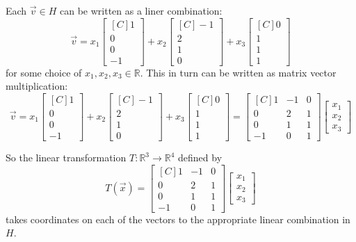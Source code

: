 \begin{example}
Each $\vec{v} \in H$ can be written as a liner combination:
\[
\vec{v}=
x_1\begin{bmatrix*}[C]1 \\ 0 \\ 0 \\ -1\end{bmatrix*}+
x_2\begin{bmatrix*}[C]-1 \\ 2 \\ 1 \\ 0\end{bmatrix*}+
x_3\begin{bmatrix*}[C]0 \\ 1 \\ 1 \\ 1\end{bmatrix*}
\]
for some choice of $x_1, x_2, x_3 \in \mathbb{R}$. This in turn can be written
as matrix vector multiplication:
\[
\vec{v}=
x_1\begin{bmatrix*}[C]1 \\ 0 \\ 0 \\ -1\end{bmatrix*}+
x_2\begin{bmatrix*}[C]-1 \\ 2 \\ 1 \\ 0\end{bmatrix*}+
x_3\begin{bmatrix*}[C]0 \\ 1 \\ 1 \\ 1\end{bmatrix*}
=
\begin{bmatrix*}[C]
1 & -1 & 0 \\
0 & 2 & 1 \\
0 & 1 & 1 \\
-1 & 0 & 1 
\end{bmatrix*}
\begin{bmatrix}
x_1 \\ x_2 \\ x_3
\end{bmatrix}
\]

So the linear transformation $T:\mathbb{R}^3 \to \mathbb{R}^4$ defined by 
\[
T(\vec{x})=\begin{bmatrix*}[C]
1 & -1 & 0 \\
0 & 2 & 1 \\
0 & 1 & 1 \\
-1 & 0 & 1 
\end{bmatrix*}
\begin{bmatrix}x_1 \\ x_2 \\ x_3 \end{bmatrix}
\]
takes coordinates on each of the vectors to the appropriate linear combination in $H$.
\end{example}



